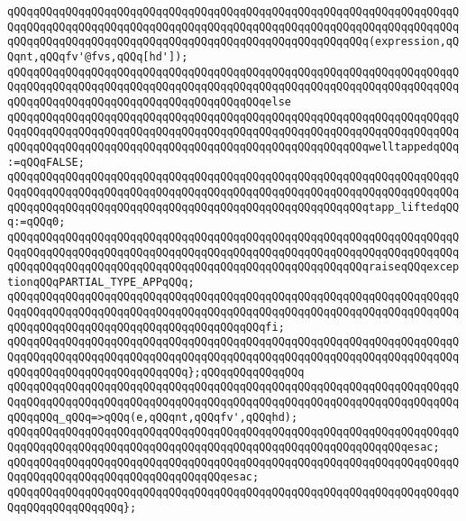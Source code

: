 \newline
\verb|qQQqqQQqqQQqqQQqqQQqqQQqqQQqqQQqqQQqqQQqqQQqqQQqqQQqqQQqqQQqqQQqqQQqqQQqqQQqqQQqqQQqqQQqqQQqqQQqqQQqqQQqqQQqqQQqqQQqqQQqqQQqqQQqqQQqqQQqqQQqqQQqqQQqqQQqqQQqqQQqqQQqqQQqqQQqqQQqqQQqqQQqqQQqqQQqqQQq(expression,qQQqnt,qQQqfv'@fvs,qQQq[hd']);|\newline
\verb|qQQqqQQqqQQqqQQqqQQqqQQqqQQqqQQqqQQqqQQqqQQqqQQqqQQqqQQqqQQqqQQqqQQqqQQqqQQqqQQqqQQqqQQqqQQqqQQqqQQqqQQqqQQqqQQqqQQqqQQqqQQqqQQqqQQqqQQqqQQqqQQqqQQqqQQqqQQqqQQqqQQqqQQqqQQqqQQqqQQqelse|\newline
\verb|qQQqqQQqqQQqqQQqqQQqqQQqqQQqqQQqqQQqqQQqqQQqqQQqqQQqqQQqqQQqqQQqqQQqqQQqqQQqqQQqqQQqqQQqqQQqqQQqqQQqqQQqqQQqqQQqqQQqqQQqqQQqqQQqqQQqqQQqqQQqqQQqqQQqqQQqqQQqqQQqqQQqqQQqqQQqqQQqqQQqqQQqqQQqqQQqqQQqwelltappedqQQq:=qQQqFALSE;|\newline
\verb|qQQqqQQqqQQqqQQqqQQqqQQqqQQqqQQqqQQqqQQqqQQqqQQqqQQqqQQqqQQqqQQqqQQqqQQqqQQqqQQqqQQqqQQqqQQqqQQqqQQqqQQqqQQqqQQqqQQqqQQqqQQqqQQqqQQqqQQqqQQqqQQqqQQqqQQqqQQqqQQqqQQqqQQqqQQqqQQqqQQqqQQqqQQqqQQqqQQqtapp_liftedqQQq:=qQQq0;|\newline
\verb|qQQqqQQqqQQqqQQqqQQqqQQqqQQqqQQqqQQqqQQqqQQqqQQqqQQqqQQqqQQqqQQqqQQqqQQqqQQqqQQqqQQqqQQqqQQqqQQqqQQqqQQqqQQqqQQqqQQqqQQqqQQqqQQqqQQqqQQqqQQqqQQqqQQqqQQqqQQqqQQqqQQqqQQqqQQqqQQqqQQqqQQqqQQqqQQqqQQqraiseqQQqexceptionqQQqPARTIAL_TYPE_APPqQQq;|\newline
\verb|qQQqqQQqqQQqqQQqqQQqqQQqqQQqqQQqqQQqqQQqqQQqqQQqqQQqqQQqqQQqqQQqqQQqqQQqqQQqqQQqqQQqqQQqqQQqqQQqqQQqqQQqqQQqqQQqqQQqqQQqqQQqqQQqqQQqqQQqqQQqqQQqqQQqqQQqqQQqqQQqqQQqqQQqqQQqqQQqqQQqfi;|\newline
\verb|qQQqqQQqqQQqqQQqqQQqqQQqqQQqqQQqqQQqqQQqqQQqqQQqqQQqqQQqqQQqqQQqqQQqqQQqqQQqqQQqqQQqqQQqqQQqqQQqqQQqqQQqqQQqqQQqqQQqqQQqqQQqqQQqqQQqqQQqqQQqqQQqqQQqqQQqqQQqqQQqqQQqqQQq};qQQqqQQqqQQqqQQq|\newline
\newline
\verb|qQQqqQQqqQQqqQQqqQQqqQQqqQQqqQQqqQQqqQQqqQQqqQQqqQQqqQQqqQQqqQQqqQQqqQQqqQQqqQQqqQQqqQQqqQQqqQQqqQQqqQQqqQQqqQQqqQQqqQQqqQQqqQQqqQQqqQQqqQQqqQQqqQQq_qQQq=>qQQq(e,qQQqnt,qQQqfv',qQQqhd);|\newline
\verb|qQQqqQQqqQQqqQQqqQQqqQQqqQQqqQQqqQQqqQQqqQQqqQQqqQQqqQQqqQQqqQQqqQQqqQQqqQQqqQQqqQQqqQQqqQQqqQQqqQQqqQQqqQQqqQQqqQQqqQQqqQQqqQQqqQQqesac;|\newline
\verb|qQQqqQQqqQQqqQQqqQQqqQQqqQQqqQQqqQQqqQQqqQQqqQQqqQQqqQQqqQQqqQQqqQQqqQQqqQQqqQQqqQQqqQQqqQQqqQQqqQQqqQQqesac;|\newline
\verb|qQQqqQQqqQQqqQQqqQQqqQQqqQQqqQQqqQQqqQQqqQQqqQQqqQQqqQQqqQQqqQQqqQQqqQQqqQQqqQQqqQQqqQQq};|\newline
